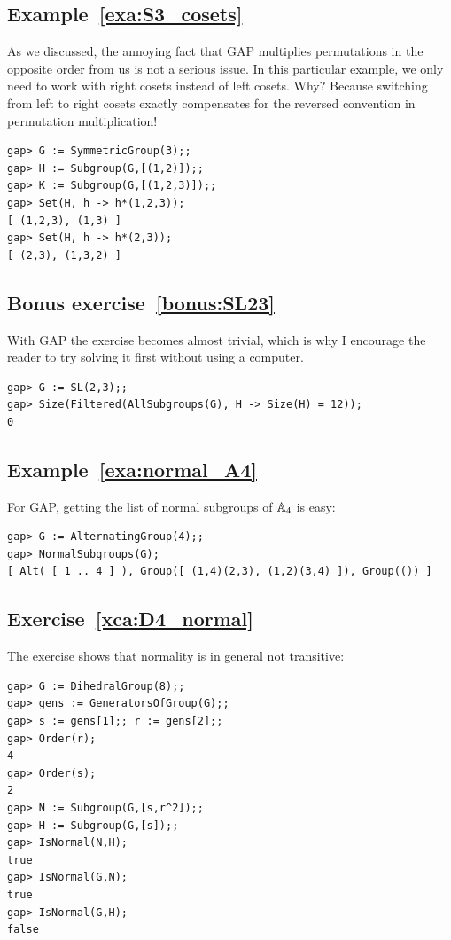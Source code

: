\subsection*{Example~\ref{exa:S3_cosets}}

As we discussed, the annoying fact that GAP multiplies permutations in the opposite order from us is not a serious issue. In this particular example, we only need to work with right cosets instead of left cosets.
Why? Because switching from left to right cosets exactly compensates for the reversed convention in permutation multiplication!

\begin{lstlisting}
gap> G := SymmetricGroup(3);;
gap> H := Subgroup(G,[(1,2)]);;
gap> K := Subgroup(G,[(1,2,3)]);;
gap> Set(H, h -> h*(1,2,3));
[ (1,2,3), (1,3) ]
gap> Set(H, h -> h*(2,3));
[ (2,3), (1,3,2) ]
\end{lstlisting}

\subsection*{Bonus exercise~\ref{bonus:SL23}}

With GAP the exercise becomes almost trivial, which is why I encourage the reader to try solving it first without using a computer.
\begin{lstlisting}
gap> G := SL(2,3);;
gap> Size(Filtered(AllSubgroups(G), H -> Size(H) = 12));
0
\end{lstlisting}

\subsection*{Example~\ref{exa:normal_A4}}

For GAP, getting the list of normal subgroups of $\mathbb{A}_4$
is easy:
\begin{lstlisting}
gap> G := AlternatingGroup(4);;
gap> NormalSubgroups(G);
[ Alt( [ 1 .. 4 ] ), Group([ (1,4)(2,3), (1,2)(3,4) ]), Group(()) ]
\end{lstlisting}


\subsection*{Exercise~\ref{xca:D4_normal}}

The exercise shows that normality is in general not transitive:
\begin{lstlisting}
gap> G := DihedralGroup(8);;
gap> gens := GeneratorsOfGroup(G);;
gap> s := gens[1];; r := gens[2];;
gap> Order(r);
4
gap> Order(s);
2
gap> N := Subgroup(G,[s,r^2]);;
gap> H := Subgroup(G,[s]);;
gap> IsNormal(N,H);
true
gap> IsNormal(G,N);
true
gap> IsNormal(G,H);
false
\end{lstlisting}

